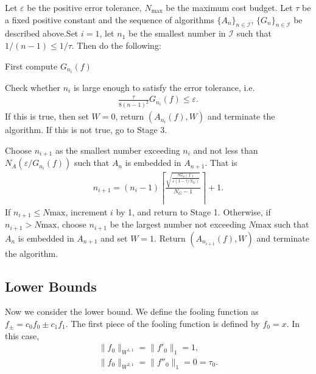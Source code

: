 \begin{algo} \label{algintegration}
\begin{description} Let $\varepsilon$ be the positive error tolerance, $N_{\text{max}}$ be the maximum cost budget. Let $\tau$ be a fixed positive constant and the sequence of algorithms $\{A_n\}_{n\in \mathcal{I}}$, $\{G_n\}_{n\in \mathcal{I}}$ be described above.Set $i=1$, let $n_1$ be the smallest number in $\mathcal{I}$ such that $1/(n-1)\leq1/\tau$. Then do the following:

\item[Stage 1.\ Estimate {$\|f''\|_{1}$}.] First compute $G_{n_i}(f)$

\item[Stage 2. Check for convergence.] Check whether $n_i$ is large enough to satisfy the error tolerance, i.e.
    \begin{align*}
      \frac{\tau}{8(n-1)^2}G_{n_i}(f)\leq \varepsilon.
    \end{align*}
    If this is true, then set $W=0$, return $(A_{n_i}(f),W)$ and terminate the algorithm. If this is not true, go to Stage 3.

\item[Stage 3. Compute $n_{i+1}$.] Choose $n_{i+1}$ as the smallest number exceeding $n_i$ and not less than $N_A(\varepsilon/G_{n_i}(f))$ such that $A_n$ is embedded in $A_{n+1}$. That is
    \begin{align*}
      n_{i+1}=(n_i-1)\left\lceil\frac{\sqrt{\frac{\tau G_{n}(f)}{\varepsilon(1 - \tau/ N_G)}}}{N_{G}-1}\right\rceil+1.
    \end{align*}
    If $n_{i+1}\leq N{\text{max}}$, increment $i$ by 1, and return to Stage 1. Otherwise, if $n_{i+1}> N{\text{max}}$, choose $n_{i+1}$ be the largest number not exceeding $N{\text{max}}$ such that $A_n$ is embedded in $A_{n+1}$ and set $W=1$. Return $(A_{n_{i+1}}(f),W)$ and terminate the algorithm.
\end{description}
\end{algo}

\subsection{Lower Bounds}
Now we consider the lower bound. We define the fooling function as $f_{\pm}=c_0f_0\pm c_1f_1$. The first piece of the fooling function is defined by $f_0=x$. In this case,
\begin{align*}
    \|f_0\|_{W^{1,1}}=\|f'_0\|_1=1,\\
    \|f_0\|_{W^{2,1}}=\|f''_0\|_1=0=\tau_0.
\end{align*}

